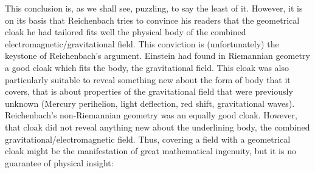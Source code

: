 \documentclass[submitted]{article}
\begin{document}
This conclusion is, as we shall see, puzzling, to say the least of it. However, it is on its basis that Reichenbach tries to convince his readers that the geometrical cloak he had tailored fits well the physical body of the combined electromagnetic/gravitational field. This conviction is (unfortunately) the keystone of Reichenbach's argument. Einstein had found in Riemannian geometry a good cloak which fits the body, the gravitational field. This cloak was also particularly suitable to reveal something new about the form of body that it covers, that is about properties of the gravitational field that were previously unknown (Mercury perihelion, light deflection, red shift, gravitational waves\etc). Reichenbach's non-Riemannian geometry was an equally good cloak. However, that cloak did not reveal anything new about the underlining body, the combined gravitational/electromagnetic field. Thus, covering a field with a geometrical cloak might be the manifestation of great mathematical ingenuity, but it is no guarantee of physical insight:
\end{document}
